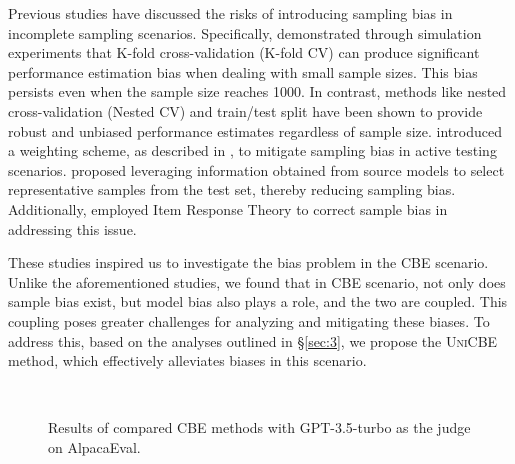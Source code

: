 Previous studies have discussed the risks of introducing sampling bias in incomplete sampling scenarios. Specifically, \citet{samplebias1} demonstrated through simulation experiments that K-fold cross-validation (K-fold CV) can produce significant performance estimation bias when dealing with small sample sizes. This bias persists even when the sample size reaches 1000. In contrast, methods like nested cross-validation (Nested CV) and train/test split have been shown to provide robust and unbiased performance estimates regardless of sample size. \citet{samplebias2} introduced a weighting scheme, as described in \citep{samplebias3}, to mitigate sampling bias in active testing scenarios. \citet{AP} proposed leveraging information obtained from source models to select representative samples from the test set, thereby reducing sampling bias. Additionally, \citet{tiny} employed Item Response Theory \citep{irt} to correct sample bias in addressing this issue.

These studies inspired us to investigate the bias problem in the CBE scenario. Unlike the aforementioned studies, we found that in CBE scenario, not only does sample bias exist, but model bias also plays a role, and the two are coupled. This coupling poses greater challenges for analyzing and mitigating these biases. To address this, based on the analyses outlined in \S\ref{sec:3}, we propose the \textsc{UniCBE} method, which effectively alleviates biases in this scenario.




\begin{figure}[htbp]
    \centering
    \hfill
    \hfill
     \\
    \hfill
    \hfill
    \caption{Results of compared CBE methods with GPT-3.5-turbo as the judge on AlpacaEval. }
    \label{fig:main-35}
\end{figure}


